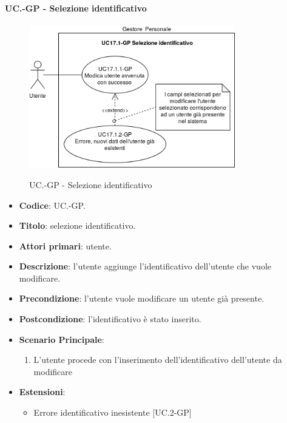 	\paragraph{UC\theuccount.\thesubuccount-GP - Selezione identificativo}
		\begin{figure}[H]
			\centering
			\includegraphics[width=0.8\textwidth]{img/casi_d'uso/UC17_1.png}\\
			\caption{UC\theuccount.\thesubuccount-GP - Selezione identificativo}
		\end{figure}
		\begin{itemize}
			\item \textbf{Codice}: UC\theuccount.\thesubuccount-GP.
			\item \textbf{Titolo}: selezione identificativo.
			\item \textbf{Attori primari}: utente.
			\item \textbf{Descrizione}: l'utente aggiunge l'identificativo dell'utente che vuole modificare.
			\item \textbf{Precondizione}: l'utente vuole modificare un utente già presente.
			\item \textbf{Postcondizione}: l'identificativo è stato inserito.
			\item \textbf{Scenario Principale}:
			\begin{enumerate}
				\item L'utente procede con l'inserimento dell'identificativo dell'utente da modificare
			\end{enumerate}
			\item \textbf{Estensioni}:
			\begin{itemize}
				\item Errore identificativo inesistente [UC\theuccount.2-GP]
			\end{itemize}
		\end{itemize}
		

